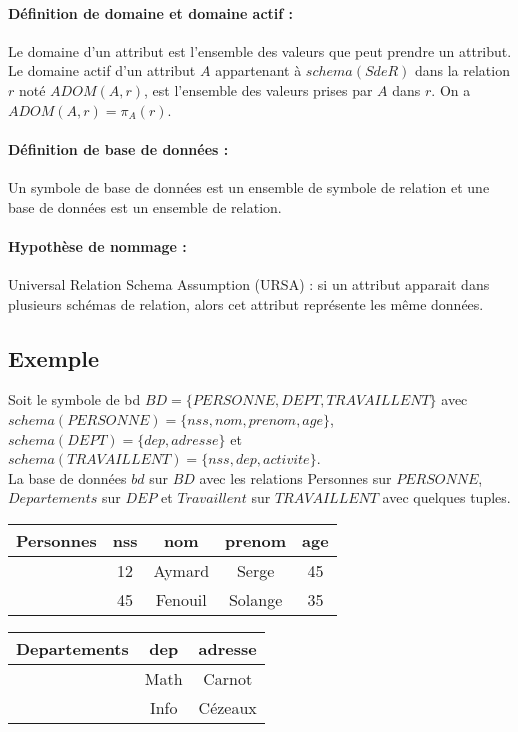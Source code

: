 \documentclass[10pt,a4paper]{article}
\begin{document}
\paragraph*{Définition de domaine et domaine actif :} Le domaine d'un attribut est l'ensemble des valeurs que peut prendre un attribut. Le domaine actif d'un attribut $A$ appartenant à $schema(SdeR)$ dans la relation $r$ noté $ADOM(A,r)$, est l'ensemble des valeurs prises par $A$ dans $r$. On a $ADOM(A,r)=\pi_{A}(r)$.\\

\paragraph*{Définition de base de données :} Un symbole de base de données est un ensemble de symbole de relation et une base de données est un ensemble de relation.\\
 
\paragraph*{Hypothèse de nommage :} Universal Relation Schema Assumption (URSA) : si un attribut apparait dans plusieurs schémas de relation, alors cet attribut représente les même données.

\subsection{Exemple}
Soit le symbole de bd $BD=\{PERSONNE, DEPT, TRAVAILLENT\}$ avec $schema(PERSONNE)=\{nss, nom, prenom, age\}$, $schema(DEPT)=\{dep, adresse\}$ et $schema(TRAVAILLENT)=\{nss, dep, activite\}$.\\

La base de données $bd$ sur $BD$ avec les relations Personnes sur $PERSONNE$, $Departements$ sur $DEP$ et $Travaillent$ sur $TRAVAILLENT$ avec quelques tuples.

\medskip

\begin{tabular}{c|cccc}
Personnes & nss & nom & prenom & age \\ 
\hline 
 & 12 & Aymard & Serge & 45 \\ 
 & 45 & Fenouil & Solange & 35 \\ 
\end{tabular} 

\medskip

\begin{tabular}{c|cc}
Departements & dep & adresse \\ 
\hline 
& Math & Carnot \\ 
& Info & Cézeaux \\ 
\end{tabular} 
\end{document}

